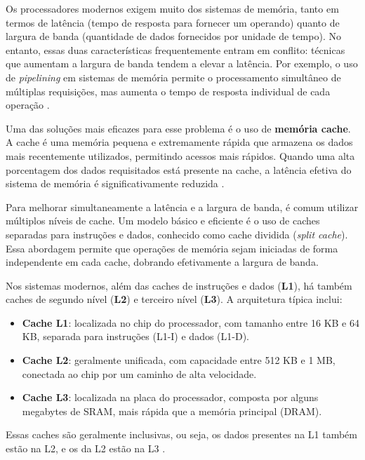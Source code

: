 \documentclass[
	12pt,				%
	openright,			%
	oneside,			%
	a4paper,			%
	english,			%
	french,				%
	spanish,			%
	brazil,				%
	]{abntex2}
\begin{document}
Os processadores modernos exigem muito dos sistemas de memória, tanto em termos de latência (tempo de resposta para fornecer um operando) quanto de largura de banda (quantidade de dados fornecidos por unidade de tempo). No entanto, essas duas características frequentemente entram em conflito: técnicas que aumentam a largura de banda tendem a elevar a latência. Por exemplo, o uso de \textit{pipelining} em sistemas de memória permite o processamento simultâneo de múltiplas requisições, mas aumenta o tempo de resposta individual de cada operação \cite[p.304]{tanenbaum_structured_2013}.

Uma das soluções mais eficazes para esse problema é o uso de \textbf{memória cache}. A cache é uma memória pequena e extremamente rápida que armazena os dados mais recentemente utilizados, permitindo acessos mais rápidos. Quando uma alta porcentagem dos dados requisitados está presente na cache, a latência efetiva do sistema de memória é significativamente reduzida \cite[p.304]{tanenbaum_structured_2013}.


Para melhorar simultaneamente a latência e a largura de banda, é comum utilizar múltiplos níveis de cache. Um modelo básico e eficiente é o uso de caches separadas para instruções e dados, conhecido como cache dividida (\textit{split cache}). Essa abordagem permite que operações de memória sejam iniciadas de forma independente em cada cache, dobrando efetivamente a largura de banda.

Nos sistemas modernos, além das caches de instruções e dados (\textbf{L1}), há também caches de segundo nível (\textbf{L2}) e terceiro nível (\textbf{L3}). A arquitetura típica inclui:

\begin{itemize}
  \item \textbf{Cache L1}: localizada no chip do processador, com tamanho entre 16 KB e 64 KB, separada para instruções (L1-I) e dados (L1-D).
  \item \textbf{Cache L2}: geralmente unificada, com capacidade entre 512 KB e 1 MB, conectada ao chip por um caminho de alta velocidade.
  \item \textbf{Cache L3}: localizada na placa do processador, composta por alguns megabytes de SRAM, mais rápida que a memória principal (DRAM).
\end{itemize}

Essas caches são geralmente inclusivas, ou seja, os dados presentes na L1 também estão na L2, e os da L2 estão na L3 \cite[p.305]{tanenbaum_structured_2013}.
\end{document}
